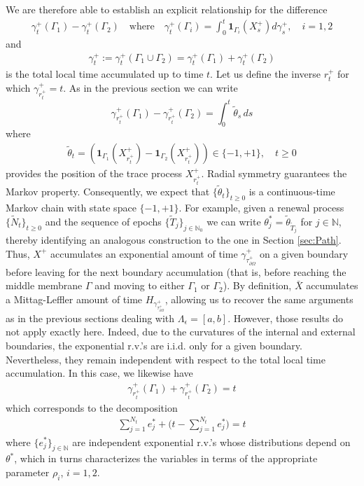 \documentclass[10pt,a4paper]{article}
\numberwithin{equation}{section}
\theoremstyle{plain}
\theoremstyle{remark}
\begin{document}
We are therefore able to establish an explicit relationship for the difference 
\begin{align*}
\gamma^+_t(\Gamma_1) - \gamma^+_t(\Gamma_2) \quad \textrm{where} \quad \gamma^+_t(\Gamma_i) = \int_0^t \mathbf{1}_{\Gamma_i}(X^+_s) d\gamma^+_s, \quad  i=1,2
\end{align*}
and 
\begin{align*}
\gamma^+_t := \gamma^+_t(\Gamma_1 \cup \Gamma_2) = \gamma^+_t(\Gamma_1) + \gamma^+_t(\Gamma_2)
\end{align*}
is the total local time accumulated up to time $t$. Let us define the inverse $r^+_t$ for which $\gamma^+_{r^+_t}=t$. As in the previous section we can write
\begin{equation}
\gamma^+_{r^+_t}(\Gamma_1) - \gamma^+_{r^+_t}(\Gamma_2) = \int_0^t \tilde{\theta}_s \, ds
\end{equation}
where
\begin{align*}
\tilde{\theta}_t = \left( \mathbf{1}_{\Gamma_1}(X^+_{r^+_t}) - \mathbf{1}_{\Gamma_2}(X^+_{r^+_t}) \right) \in \{-1, +1\}, \quad t\geq 0
\end{align*}
provides the position of the trace process $X^+_{r^+_t}$. Radial symmetry guarantees the Markov property. Consequently, we expect that $\{\tilde{\theta}_t\}_{t \geq 0}$ is a continuous-time Markov chain with state space $\{-1, +1\}$. For example, given a renewal process $\{\tilde{N}_t\}_{t\geq 0}$ and the sequence of epochs $\{\tilde{T}_j\}_{j \in \mathbb{N}_0}$ we can write $\theta^*_j = \tilde{\theta}_{\tilde{T}_j}$ for $j \in \mathbb{N}$, thereby identifying an analogous construction to the one in Section \ref{sec:Path}. \\


Thus, $X^+$ accumulates an exponential amount of time $\gamma^+_{\tau^+_{\partial \Omega}}$ on a given boundary before leaving for the next boundary accumulation (that is, before reaching the middle membrane $\Gamma$ and moving to either $\Gamma_1$ or $\Gamma_2$). By definition, $\bar{X}$ accumulates a Mittag-Leffler amount of time  $H_{\gamma^+_{\tau^+_{\partial \Omega}}}$, allowing us to recover the same arguments as in the previous sections dealing with $\Lambda_\epsilon = [a, b]$. However, those results do not apply exactly here. Indeed, due to the curvatures of the internal and external boundaries, the exponential r.v.'s  are i.i.d. only for a given boundary. Nevertheless, they remain independent with respect to the total local time accumulation. In this case,  we likewise have
\begin{align*}
\gamma^+_{r^+_t}(\Gamma_1) + \gamma^+_{r^+_t}(\Gamma_2) = t
\end{align*}
which corresponds to the decomposition
\begin{align*}
\sum_{j=1}^{N_t} e^*_j + \big(t - \sum_{j=1}^{N_t} e^*_j\big) = t
\end{align*}
where $\{e^*_j\}_{j \in \mathbb{N}}$ are independent exponential r.v.'s whose distributions depend on $\theta^*$, which in turns characterizes the variables in terms of the appropriate parameter $\rho_i$, $i=1,2$.  
\end{document}
